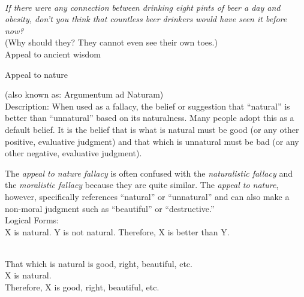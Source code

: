 \documentclass[a4paper,12pt,single,pdftex]{scrartcl}
\begin{document}
    
       
    \\

    
      {\em If there were any connection between drinking eight pints of beer a day and obesity, don’t you think that countless beer drinkers would have seen it before now?}
    \\

    
      (Why should they? They cannot even see their own toes.)
    \\

  

Appeal to ancient wisdom

Appeal to nature
    
      (also known as: Argumentum ad Naturam)
    \\

  
    Description: When used as a fallacy, the belief or suggestion that “natural” is better than “unnatural” based on its naturalness. Many people adopt this as a default belief. It is the belief that is what is natural must be good (or any other positive, evaluative judgment) and that which is unnatural must be bad (or any other negative, evaluative judgment).

    
      The {\it appeal to nature fallacy} is often confused with the {\it naturalistic fallacy} and the {\it moralistic fallacy} because they are quite similar. The {\it appeal to nature}, however, specifically references “natural” or “unnatural” and can also make a non-moral judgment such as “beautiful” or “destructive.”
    \\

    
      Logical Forms:
    \\

    
      X is natural. \newline
Y is not natural. \newline
Therefore, X is better than Y. \newline
 \newline

    \\

    
      That which is natural is good, right, beautiful, etc.
    \\

    
      X is natural.
    \\

    
      Therefore, X is good, right, beautiful, etc. \newline
 \newline
\end{document}
